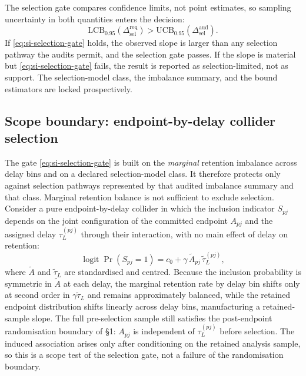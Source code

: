 \documentclass[11pt,a4paper]{article}
\theoremstyle{definition}
\newcommand{\UCB}{\mathrm{UCB}_{0.95}}
\newcommand{\LCB}{\mathrm{LCB}_{0.95}}
\begin{document}
The selection gate compares confidence limits, not point estimates, so sampling
uncertainty in both quantities enters the decision:
\begin{equation}
\label{eq:si-selection-gate}
\LCB\!\left(\Delta_{\mathrm{sel}}^{\mathrm{req}}\right)
>\UCB\!\left(\Delta_{\mathrm{sel}}^{\mathrm{aud}}\right).
\end{equation}
If \eqref{eq:si-selection-gate} holds, the observed slope is larger than any
selection pathway the audits permit, and the selection gate passes. If the slope
is material but \eqref{eq:si-selection-gate} fails, the result is reported as
selection-limited, not as support. The selection-model class, the imbalance
summary, and the bound estimators are locked prospectively.

\subsection{Scope boundary: endpoint-by-delay collider selection}
\label{sec:si-collider}

The gate \eqref{eq:si-selection-gate} is built on the \textit{marginal} retention
imbalance across delay bins and on a declared selection-model class. It therefore
protects only against selection pathways represented by that audited imbalance
summary and that class. Marginal retention balance is not sufficient to exclude
selection. Consider a pure endpoint-by-delay collider in which the inclusion
indicator \(S_{pj}\) depends on the joint configuration of the committed endpoint
\(A_{pj}\) and the assigned delay \(\tau^{(pj)}_L\) through their interaction, with
no main effect of delay on retention:
\begin{equation}
\label{eq:si-collider}
\operatorname{logit}\Pr(S_{pj}=1)=c_0+\gamma\,
\tilde A_{pj}\,\tilde\tau^{(pj)}_L,
\end{equation}
where \(\tilde A\) and \(\tilde\tau_L\) are standardised and centred. Because the
inclusion probability is symmetric in \(\tilde A\) at each delay, the marginal
retention rate by delay bin shifts only at second order in \(\gamma\tilde\tau_L\)
and remains approximately balanced, while the retained endpoint distribution shifts
linearly across delay bins, manufacturing a retained-sample slope. The full
pre-selection sample still satisfies the post-endpoint randomisation boundary of
\S1: \(A_{pj}\) is independent of \(\tau^{(pj)}_L\) before selection. The induced
association arises only after conditioning on the retained analysis sample, so this
is a scope test of the selection gate, not a failure of the randomisation boundary.
\end{document}
